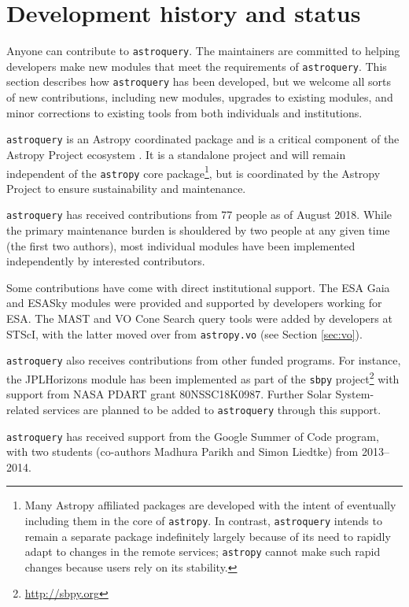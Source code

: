\documentclass[twocolumn]{aastex62}
\newcommand{\package}[1]{\texttt{#1}\xspace}
\newcommand{\astroquery}{\package{astroquery}}
\newcommand{\astropy}{Astropy\xspace}
\newcommand{\astropypkg}{\package{astropy}}
\begin{document}
\section{Development history and status}
\label{sec:development}
Anyone can contribute to \astroquery.  The maintainers are committed to helping
developers make new modules that meet the requirements of \astroquery.  This
section describes how \astroquery has been developed, but we welcome all sorts
of new contributions, including new modules, upgrades to existing modules, and
minor corrections to existing tools from both individuals and institutions.

\astroquery is an \astropy coordinated package \citep{APE15} and is a critical
component of the \astropy Project ecosystem \citep{Astropy-Collaboration2018}.
It is a standalone project and will remain independent of the \astropypkg core
package\footnote{Many \astropy affiliated packages are developed with the
intent of eventually including them in the core of \astropypkg.  In contrast,
\astroquery intends to remain a separate package indefinitely largely because
of its need to rapidly adapt to changes in the remote services; \astropypkg
cannot make such rapid changes because users rely on its stability.}, but is
coordinated by the \astropy Project to ensure sustainability and maintenance.

\astroquery has received contributions from 77 people as of August 2018.  While the primary maintenance
burden is shouldered by two people at any given time (the first two authors),
most individual modules have been implemented independently by interested
contributors.

Some contributions have come with direct institutional support.  The ESA Gaia and
ESASky modules were provided and supported by developers working for ESA\@.  The
MAST and VO Cone Search query tools were added by developers at STScI, with the
latter moved over from \texttt{astropy.vo} (see Section \ref{sec:vo}).

\astroquery also receives contributions from other funded programs. For instance, the
JPLHorizons module has been implemented as part of the \texttt{sbpy}
project\footnote{\url{http://sbpy.org}} with support from NASA PDART grant
80NSSC18K0987. Further Solar System-related services are planned to be added to
\astroquery through this support.

\astroquery has received support from the Google Summer of Code
program, with two students (co-authors Madhura Parikh and Simon Liedtke)
from 2013--2014.
\end{document}
